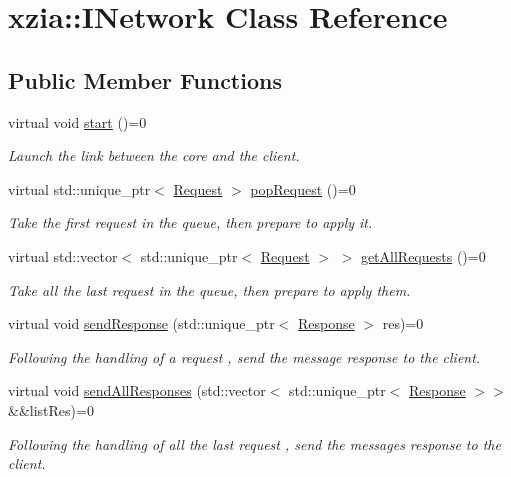 \hypertarget{classxzia_1_1INetwork}{}\section{xzia\+:\+:I\+Network Class Reference}
\label{classxzia_1_1INetwork}
\subsection*{Public Member Functions}
\begin{DoxyCompactItemize}
\item 
\mbox{\label{classxzia_1_1INetwork_a38e0ca8cbacfa2a902cfef550168a81a}} 
virtual void \mbox{\hyperlink{classxzia_1_1INetwork_a38e0ca8cbacfa2a902cfef550168a81a}{start}} ()=0
\begin{DoxyCompactList}\small\item\em Launch the link between the core and the client. \end{DoxyCompactList}\item 
virtual std\+::unique\+\_\+ptr$<$ \mbox{\hyperlink{structxzia_1_1Request}{Request}} $>$ \mbox{\hyperlink{classxzia_1_1INetwork_ae4dc3136855391f174daef8da2bab5d1}{pop\+Request}} ()=0
\begin{DoxyCompactList}\small\item\em Take the first request in the queue, then prepare to apply it. \end{DoxyCompactList}\item 
virtual std\+::vector$<$ std\+::unique\+\_\+ptr$<$ \mbox{\hyperlink{structxzia_1_1Request}{Request}} $>$ $>$ \mbox{\hyperlink{classxzia_1_1INetwork_a0a209aa9651aafb551504d6522c20809}{get\+All\+Requests}} ()=0
\begin{DoxyCompactList}\small\item\em Take all the last request in the queue, then prepare to apply them. \end{DoxyCompactList}\item 
virtual void \mbox{\hyperlink{classxzia_1_1INetwork_a3d2089720daf1863762e53bfda6ad08c}{send\+Response}} (std\+::unique\+\_\+ptr$<$ \mbox{\hyperlink{structxzia_1_1Response}{Response}} $>$ res)=0
\begin{DoxyCompactList}\small\item\em Following the handling of a request , send the message response to the client. \end{DoxyCompactList}\item 
virtual void \mbox{\hyperlink{classxzia_1_1INetwork_a96edde2fedeca124c08a31d4164a1a87}{send\+All\+Responses}} (std\+::vector$<$ std\+::unique\+\_\+ptr$<$ \mbox{\hyperlink{structxzia_1_1Response}{Response}} $>$$>$ \&\&list\+Res)=0
\begin{DoxyCompactList}\small\item\em Following the handling of all the last request , send the messages response to the client. \end{DoxyCompactList}\end{DoxyCompactItemize}


